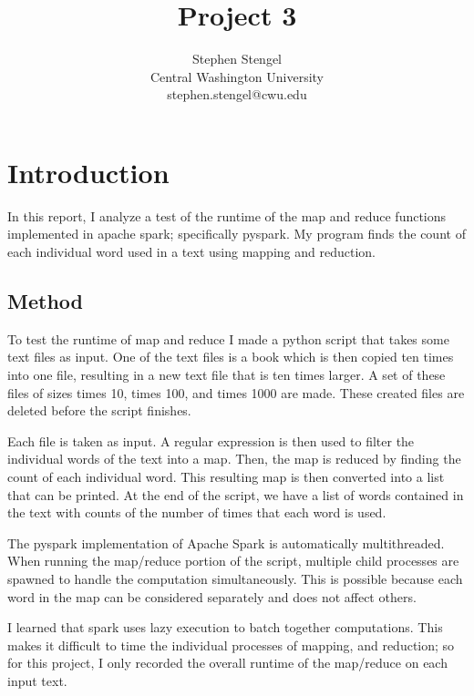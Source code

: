\documentclass[12pt, letterpaper]{article}
\title{Project 3}
\author{Stephen Stengel\\Central Washington University\\stephen.stengel@cwu.edu}
\begin{document}
\begin{titlepage}
\maketitle


\end{titlepage}


\tableofcontents
\listoffigures
\newpage


\section{Introduction}
In this report, I analyze a test of the runtime of the map and reduce functions implemented in apache spark; specifically pyspark. My program finds the count of each individual word used in a text using mapping and reduction.


\subsection{Method}
To test the runtime of map and reduce I made a python script that takes some text files as input. One of the text files is a book which is then copied ten times into one file, resulting in a new text file that is ten times larger. A set of these files of sizes times 10, times 100, and times 1000 are made. These created files are deleted before the script finishes.

Each file is taken as input. A regular expression is then used to filter the individual words of the text into a map. Then, the map is reduced by finding the count of each individual word. This resulting map is then converted into a list that can be printed. At the end of the script, we have a list of words contained in the text with counts of the number of times that each word is used.

The pyspark implementation of Apache Spark is automatically multithreaded. When running the map/reduce portion of the script, multiple child processes are spawned to handle the computation simultaneously. This is possible because each word in the map can be considered separately and does not affect others.

I learned that spark uses lazy execution to batch together computations. This makes it difficult to time the individual processes of mapping, and reduction; so for this project, I only recorded the overall runtime of the map/reduce on each input text.
\end{document}
